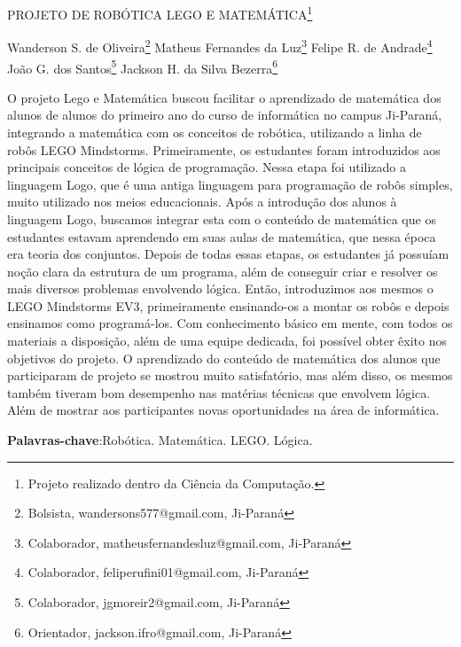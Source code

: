 \documentclass[article,12pt,onesidea,4paper,english,brazil]{abntex2}
\begin{document}
	
	
	\frenchspacing 
	
	\begin{center}
		\LARGE PROJETO DE ROBÓTICA LEGO E MATEMÁTICA\footnote{Projeto realizado dentro da Ciência da Computação.}
		
		\normalsize
		Wanderson S. de Oliveira\footnote{Bolsista, wandersons577@gmail.com, Ji-Paraná} 
		Matheus Fernandes da Luz\footnote{Colaborador, matheusfernandesluz@gmail.com, Ji-Paraná} 
		Felipe R. de Andrade\footnote{Colaborador, feliperufini01@gmail.com, Ji-Paraná} 
		João G. dos Santos\footnote{Colaborador, jgmoreir2@gmail.com, Ji-Paraná} 
		Jackson H. da Silva Bezerra\footnote{Orientador, jackson.ifro@gmail.com, Ji-Paraná}
	\end{center}
	
	\noindent O projeto Lego e Matemática buscou facilitar o aprendizado de matemática dos
	alunos de alunos do primeiro ano do curso de informática no campus Ji-Paraná,
	integrando a matemática com os conceitos de robótica, utilizando a linha de robôs
	LEGO Mindstorms. Primeiramente, os estudantes foram introduzidos aos principais
	conceitos de lógica de programação. Nessa etapa foi utilizado a linguagem Logo,
	que é uma antiga linguagem para programação de robôs simples, muito utilizado nos
	meios educacionais. Após a introdução dos alunos à linguagem Logo, buscamos
	integrar esta com o conteúdo de matemática que os estudantes estavam
	aprendendo em suas aulas de matemática, que nessa época era teoria dos
	conjuntos. Depois de todas essas etapas, os estudantes já possuíam noção clara da
	estrutura de um programa, além de conseguir criar e resolver os mais diversos
	problemas envolvendo lógica. Então, introduzimos aos mesmos o LEGO Mindstorms
	EV3, primeiramente ensinando-os a montar os robôs e depois ensinamos como
	programá-los. Com conhecimento básico em mente, com todos os materiais a
	disposição, além de uma equipe dedicada, foi possível obter êxito nos objetivos do
	projeto. O aprendizado do conteúdo de matemática dos alunos que participaram de
	projeto se mostrou muito satisfatório, mas além disso, os mesmos também tiveram
	bom desempenho nas matérias técnicas que envolvem lógica. Além de mostrar aos
	participantes novas oportunidades na área de informática.
	
	\vspace{\onelineskip}
	
	\noindent
	\textbf{Palavras-chave}:Robótica. Matemática. LEGO. Lógica.
	
\end{document}
